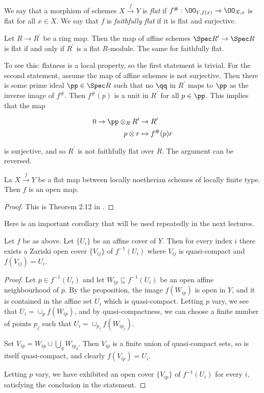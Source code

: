 \documentclass[11pt, english]{article}
\begin{document}
\begin{defi}
We say that a morphism of schemes $X \xrightarrow{f} Y$ is \emph{flat} if $f^\#:\OO_{Y,f(x)} \to \OO_{X,x}$ is flat for all $x \in X$. We say that $f$ is \emph{faithfully flat} if it is flat and surjective.
\end{defi}

\begin{remark}
Let $R \to R^\prime$ be a ring map. Then the map of affine schemes $\Spec R^\prime \to \Spec R$ is flat if and only if $R^\prime$ is a flat $R$-module. The same for faithfully flat.

To see this: flatness is a local property, so the first statement is trivial. For the second statement, assume the map of affine schemes is not surjective. Then there is some prime ideal $\pp \in \Spec R$ such that no $\qq$ in $R^\prime$ maps to $\pp$ as the inverse image of $f^\#$. Then $f^\#(p)$ is a unit in $R^\prime$ for all $p \in \pp$. This implies that the map

\begin{align*}
0 \to \pp \otimes_R R^\prime &\to R^\prime \\
p \otimes r &\mapsto f^\#(p)r
\end{align*}

is surjective, and so $R^\prime$ is not faithfully flat over $R$. The argument can be reversed.
\end{remark}

\begin{prop}
\label{prop:flatopen}
La $X \xrightarrow{f} Y$ be a flat map between locally noetherian schemes of locally finite type. Then $f$ is an open map.
\end{prop}
\begin{proof}
This is Theorem 2.12 in \cite{milne_etale}.  
\end{proof}

Here is an important corollary that will be used repeatedly in the next lectures.

\begin{corr}
\label{corr:fppfcover}
Let $f$ be as above. Let $\{U_i \}$ be an affine cover of $Y$. Then for every index $i$ there exists a Zariski open cover $\{ V_{ij} \}$ of $f^{-1}(U_i)$ where $V_{ij}$ is quasi-compact and $f(V_{ij})=U_i$.
\end{corr}
\begin{proof}
Let $p \in f^{-1}(U_i)$ and let $W_{ip} \subseteq f^{-1}(U_i)$ be an open affine neighbourhood of $p$. By the proposition, the image $f(W_{ip})$ is open in $Y$, and it is contained in the affine set $U_i$ which is quasi-compact. Letting $p$ vary, we see that $U_i = \cup_p f(W _{ip})$, and by quasi-compactness, we can choose a finite number of points $p_j$ such that $U_i= \cup_{p_j} f(W_{ip_j})$. 

Set $V_{ip} = W_{ip} \cup \bigcup_q W_{ip_q}$. Then $V_{ip}$ is a finite union of quasi-compact sets, so is itself quasi-compact, and clearly $f(V_{ip})=U_i$. 

Letting $p$ vary, we have exhibited an open cover $\{V_{ip}\}$ of $f^{-1}(U_i)$ for every $i$, satisfying the conclusion in the statement.
\end{proof}
\end{document}
